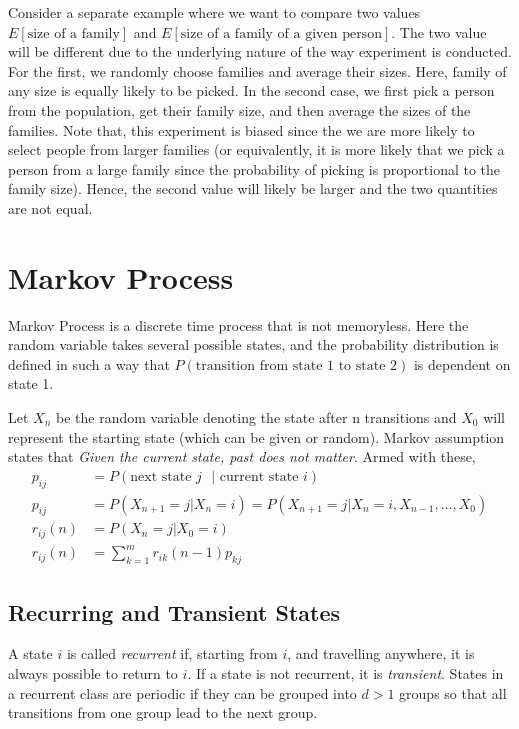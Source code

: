 \documentclass[11pt, a4paper]{article}
\begin{document}
    Consider a separate example where we want to compare two values $E[\text{size of a family}]$ and $E[\text{size of a family of a given person}]$.\newline
    The two value will be different due to the underlying nature of the way experiment is conducted. For the first, we randomly choose families and average their sizes. Here, family of any size is equally likely to be picked. In the second case, we first pick a person from the population, get their family size, and then average the sizes of the families. Note that, this experiment is biased since the we are more likely to select people from larger families (or equivalently, it is more likely that we pick a person from a large family since the probability of picking is proportional to the family size). Hence, the second value will likely be larger and the two quantities are not equal.


    \section{Markov Process}
    Markov Process is a discrete time process that is not memoryless. Here the random variable takes several possible states, and the probability distribution is defined in such a way that $P(\text{transition from state 1 to state 2})$ is dependent on state 1.\newline

    Let $X_{n}$ be the random variable denoting the state after n transitions and $X_{0}$ will represent the starting state (which can be given or random). Markov assumption states that \emph{Given the current state, past does not matter}. Armed with these,
    \begin{align*}
        p_{ij} &= P(\text{next state $j$ $|$ current state $i$})\\
        p_{ij} &= P(X_{n+1}=j|X_{n}=i) = P(X_{n+1}=j|X_{n}=i, X_{n-1}, \ldots, X_{0})\\
        r_{ij}(n) &= P(X_{n}=j|X_{0}=i) \tag*{or, in state $j$ after $n$ steps}\\
        r_{ij}(n) &= \sum_{k=1}^{m} r_{ik}(n-1)p_{kj}
    \end{align*}

    \subsection{Recurring and Transient States}
    A state $i$ is called \emph{recurrent} if, starting from $i$, and travelling anywhere, it is always possible to return to $i$. If a state is not recurrent, it is \emph{transient}. States in a recurrent class are periodic if they can be grouped into $d > 1$ groups so that all transitions from one group lead to the next group.
\end{document}
